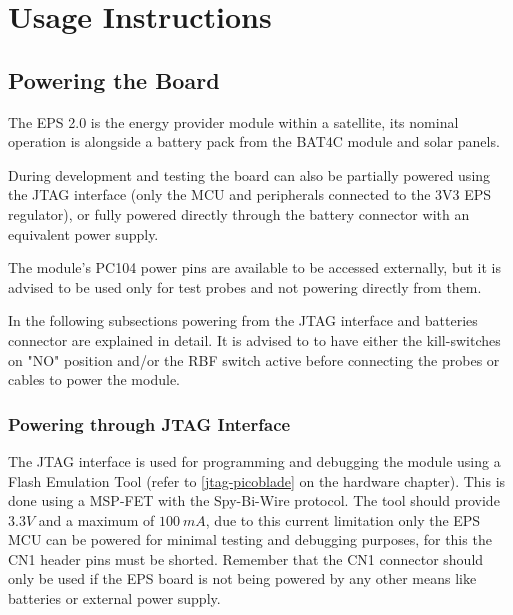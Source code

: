 %
%
%
%
%

%
%
%
%
%
%

\chapter{Usage Instructions} \label{ch:instructions}

\section{Powering the Board}

The EPS 2.0 is the energy provider module within a satellite, its nominal operation is alongside a battery pack from the BAT4C module and solar panels. 

During development and testing the board can also be partially powered using the JTAG interface (only the MCU and peripherals connected to the 3V3 EPS regulator), or fully powered directly through the battery connector with an equivalent power supply.

The module's PC104 power pins are available to be accessed externally, but it is advised to be used only for test probes and not powering directly from them. 

In the following subsections powering from the JTAG interface and batteries connector are explained in detail. 
It is advised to to have either the kill-switches on "NO" position and/or the RBF switch active before connecting the probes or cables to power the module.

 
\subsection{Powering through JTAG Interface}

The JTAG interface is used for programming and debugging the module using a Flash Emulation Tool (refer to \autoref{jtag-picoblade} on the hardware chapter). 
This is done using a MSP-FET with the Spy-Bi-Wire protocol.
The tool should provide $3.3 V$ and a maximum of $100\ mA$, due to this current limitation only the EPS MCU can be powered for minimal testing and debugging purposes, for this the CN1 header pins must be shorted.
Remember that the CN1 connector should only be used if the EPS board is not being powered by any other means like batteries or external power supply.

